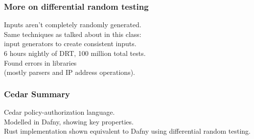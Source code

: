 \documentclass{beamer}
\newenvironment{changemargin}[1]{%
  \begin{list}{}{%
    \setlength{\topsep}{0pt}%
    \setlength{\leftmargin}{#1}%
    \setlength{\rightmargin}{1em}
    \setlength{\listparindent}{\parindent}%
    \setlength{\itemindent}{\parindent}%
    \setlength{\parsep}{\parskip}%
  }%
  \item[]}{\end{list}}
\begin{document}
\begin{frame}[fragile]
  \frametitle{More on differential random testing}
  \large
  \begin{changemargin}{1cm}
      Inputs aren't completely randomly generated. \\[1em]
      Same techniques as talked about in this class:\\ input generators to create consistent inputs.\\[1em]
      6 hours nightly of DRT, 100 million total tests.\\[1em]
      Found errors in libraries \\ \qquad (mostly parsers and IP address operations).
  \end{changemargin}
\end{frame}

\begin{frame}[fragile]
  \frametitle{Cedar Summary}
  \Large
  \begin{changemargin}{1cm}
    Cedar policy-authorization language.\\[1em]
    Modelled in Dafny, showing key properties.\\[1em]
    Rust implementation shown equivalent to Dafny using differential random testing.
  \end{changemargin}
\end{frame}
\end{document}
